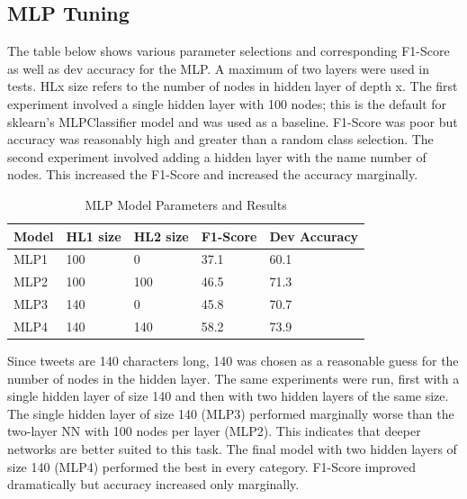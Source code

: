 \documentclass[11pt,a4paper]{article}
\begin{document}
\subsection{MLP Tuning}
The table below shows various parameter selections and corresponding F1-Score as well as dev accuracy for the MLP. A maximum of two layers were used in tests. HLx size refers to the number of nodes in hidden layer of depth x. The first experiment involved a single hidden layer with 100 nodes; this is the default for sklearn’s MLPClassifier model and was used as a baseline. F1-Score was poor but accuracy was reasonably high and greater than a random class selection. The second experiment involved adding a hidden layer with the name number of nodes. This increased the F1-Score and increased the accuracy marginally.

\begin{table}[htp]
	\centering
	\caption{MLP Model Parameters and Results}
	\label{my-label}
	\begin{tabular}{@{}lllll@{}}
		\toprule
		Model       & HL1 size & HL2 size & F1-Score & Dev Accuracy \\ \midrule
		MLP1 		& 100     & 0  &     37.1 & 60.1  \\
		MLP2        & 100     & 100    &   46.5 & 71.3 \\
		MLP3     	& 140     & 0   &     45.8 & 70.7    \\
		MLP4        & 140     & 140    &   58.2 & 73.9  \\ \bottomrule

	\end{tabular}
\end{table} 
Since tweets are 140 characters long, 140 was chosen as a reasonable guess for the number of nodes in the hidden layer. The same experiments were run, first with a single hidden layer of size 140 and then with two hidden layers of the same size. The single hidden layer of size 140 (MLP3) performed marginally worse than the two-layer NN with 100 nodes per layer (MLP2). This indicates that deeper networks are better suited to this task. The final model with two hidden layers of size 140 (MLP4) performed the best in every category. F1-Score improved dramatically but accuracy increased only marginally.
\end{document}
